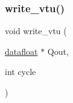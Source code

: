 \subsubsection{\texorpdfstring{write\+\_\+vtu()}{write\_vtu()}}
{\footnotesize\ttfamily void write\+\_\+vtu (\begin{DoxyParamCaption}\item[{\hyperlink{a00557_aa484d27c864c1a224505d8a302c0a4a4}{datafloat} $\ast$}]{Qout,  }\item[{int}]{cycle }\end{DoxyParamCaption})}

